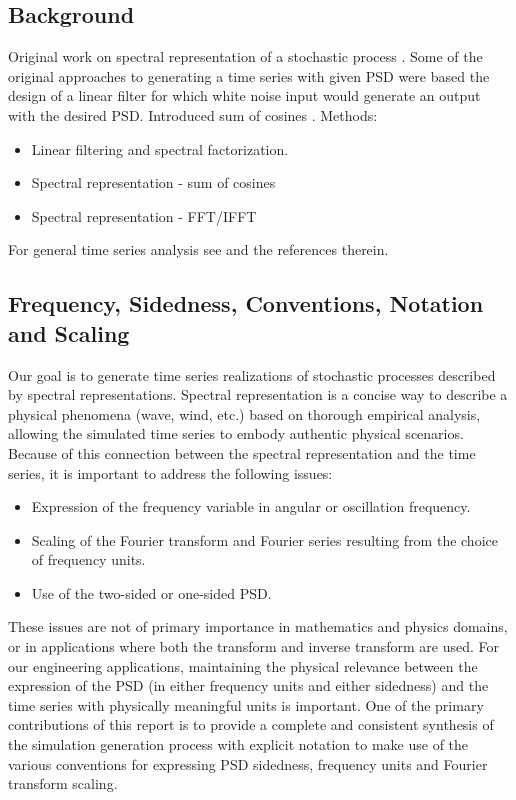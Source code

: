 \documentclass[techreport, article]{npsreport2018}
\begin{document}
\subsection{Background}
Original work on spectral representation of a stochastic process \cite{rice44mathematical1,rice45mathematical2}.  Some of the original approaches to generating a time series with given PSD were based the design of a linear filter for which white noise input would generate an output with the desired PSD.  Introduced sum of cosines \cite{borgman69ocean, shinozuka72monte}.  Methods:
\begin{itemize}
\item Linear filtering and spectral factorization.
\item Spectral representation - sum of cosines
\item Spectral representation - FFT/IFFT
\end{itemize}
\noindent
For general time series analysis see \cite{marchal15notes} and the references therein.

\subsection{Frequency, Sidedness, Conventions, Notation and Scaling}

Our goal is to generate time series realizations of stochastic processes described by spectral representations.  Spectral representation is a concise way to describe a physical phenomena (wave, wind, etc.) based on thorough empirical analysis, allowing the simulated time series to embody authentic physical scenarios.  Because of this connection between the spectral representation and the time series, it is important to address the following issues:
\begin{itemize}
\item Expression of the frequency variable in angular or oscillation frequency.
\item Scaling of the Fourier transform and Fourier series resulting from the choice of frequency units.
\item Use of the two-sided or one-sided PSD.
\end{itemize}
These issues are not of primary importance in mathematics and physics domains, or in applications where both the transform and inverse transform are used.  For our engineering applications, maintaining the physical relevance between the expression of the PSD (in either frequency units and either sidedness) and the time series with physically meaningful units is important.  One of the primary contributions of this report is to provide a complete and consistent synthesis of the simulation generation process with explicit notation to make use of the various conventions for expressing PSD sidedness, frequency units and Fourier transform scaling.
\end{document}

